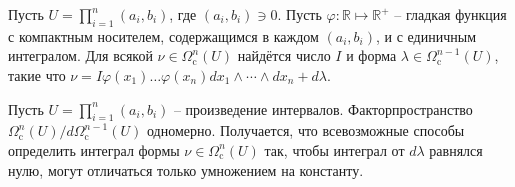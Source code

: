 \begin{to_lem} 
\label{lem_6.100}
    Пусть $U = \prod_{i=1}^n (a_i, b_i)$, где $(a_i, b_i) \ni 0$. Пусть $\varphi \colon \mathbb{R} \mapsto \mathbb{R}^+$ -- гладкая функция с компактным носителем, содержащимся в каждом $(a_i, b_i)$, и с единичным интегралом. Для всякой $\nu \in \Omega_{\text{c}}^n (U)$ найдётся число $I$ и форма $\lambda \in \Omega_{\text{c}}^{n-1}(U)$, такие что
    $\nu = I \varphi(x_1) \ldots \varphi(x_n) dx_1 \wedge \cdots \wedge dx_n + d \lambda$.
\end{to_lem}


\begin{to_con} 
\label{con_6.101}
    Пусть $U = \prod_{i=1}^{n} (a_i, b_i)$ -- произведение интервалов. Факторпространство $\Omega_{\text{c}}^n(U) / d \Omega_{\text{c}}^{n-1} (U)$ одномерно. Получается, что всевозможные способы определить интеграл формы $\nu \in \Omega_{\text{c}}^n (U)$ так, чтобы интеграл от $d \lambda$ равнялся нулю, могут отличаться только умножением на константу.  
\end{to_con}